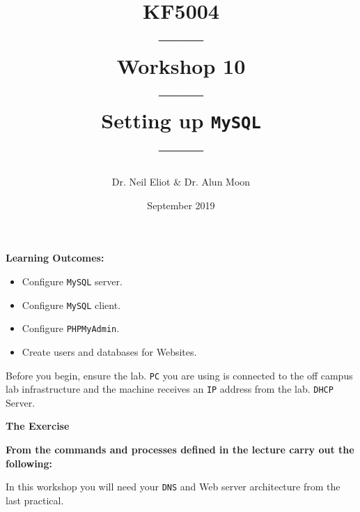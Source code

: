 \documentclass[11pt]{article}
\begin{document}
\author{Dr. Neil Eliot \& Dr. Alun Moon}
\title{KF5004\\------\\Workshop 10\\------\\Setting up \texttt{MySQL}\\------}
\date{September 2019}
\maketitle

\newpage



\noindent\textbf{Learning Outcomes:}
\begin{itemize}
    \item Configure \texttt{MySQL} server.
    \item Configure \texttt{MySQL} client.
    \item Configure \texttt{PHPMyAdmin}.
    \item Create users and databases for Websites.
\end{itemize}


\begin{tcolorbox}[title={\textbf{Important:}}]
    Before you begin, ensure the lab. \texttt{PC} you are using is connected to the off campus lab infrastructure and the machine receives an \texttt{IP} address from the lab. \texttt{DHCP} Server.
\end{tcolorbox}
\newpage

\noindent\textbf{The Exercise}\\
\begin{tcolorbox}[colback=blue!20]
    \noindent\textbf{From the commands and processes defined in the lecture carry out the following:}
\end{tcolorbox}


\begin{tcolorbox}[title={\textbf{NOTE:}}]
    In this workshop you will need your \texttt{DNS} and Web server architecture from the last practical.
\end{tcolorbox}
\end{document}
